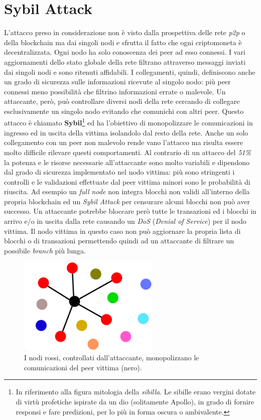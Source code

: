 \section{Sybil Attack}
L'attacco preso in considerazione non è visto dalla prospettiva delle rete \textit{p2p} o della blockchain ma dai singoli nodi e sfrutta il fatto che ogni criptomoneta è decentralizzata. Ogni nodo ha solo conoscenza dei peer ad esso connessi. I vari aggiornamenti dello stato globale della rete filtrano attraverso messaggi inviati dai singoli nodi e sono ritenuti affidabili.\newline
I collegamenti, quindi, definiscono anche un grado di sicurezza sulle informazioni ricevute al singolo nodo: più peer connessi meno possibilità che filtrino informazioni errate o malevole. Un attaccante, però, può controllare diversi nodi della rete cercando di collegare esclusivamente un singolo nodo evitando che comunichi con altri peer. Questo attacco è chiamato \textbf{Sybil}\footnote{In riferimento alla figura mitologia della \textit{sibilla}. Le sibille erano vergini dotate di virtù profetiche ispirate da un dio (solitamente Apollo), in grado di fornire responsi e fare predizioni, per lo più in forma oscura o ambivalente.} ed ha l'obiettivo di monopolizzare le comunicazioni in ingresso ed in uscita della vittima isolandolo dal resto della rete. Anche un solo collegamento con un peer non malevolo rende vano l'attacco ma risulta essere molto difficile rilevare questi comportamenti.\newline
Al contrario di un attacco del \textit{51\%} la potenza e le risorse necessarie all'attaccante sono molto variabili e dipendono dal grado di sicurezza implementato nel nodo vittima: più sono stringenti i controlli e le validazioni effettuate dal peer vittima minori sono le probabilità di riuscita. Ad esempio un \textit{full node} non integra blocchi non validi all'interno della propria blockchain ed un \textit{Sybil Attack} per censurare alcuni blocchi non può aver successo. Un attaccante potrebbe bloccare però tutte le transazioni ed i blocchi in arrivo e/o in uscita dalla rete causando un \textit{DoS} (\textit{Denial of Service}) per il nodo vittima. Il nodo vittima in questo caso non può aggiornare la propria lista di blocchi o di transazioni permettendo quindi ad un attaccante di filtrare un possibile \textit{branch} più lunga.\newline
\begin{figure}
    \centering
    \includegraphics[width=0.6\textwidth]{images/sybil.png}
    \caption{I nodi rossi, controllati dall'attaccante, monopolizzano le comunicazioni del peer vittima (nero). \cite{owning}}
\end{figure}
